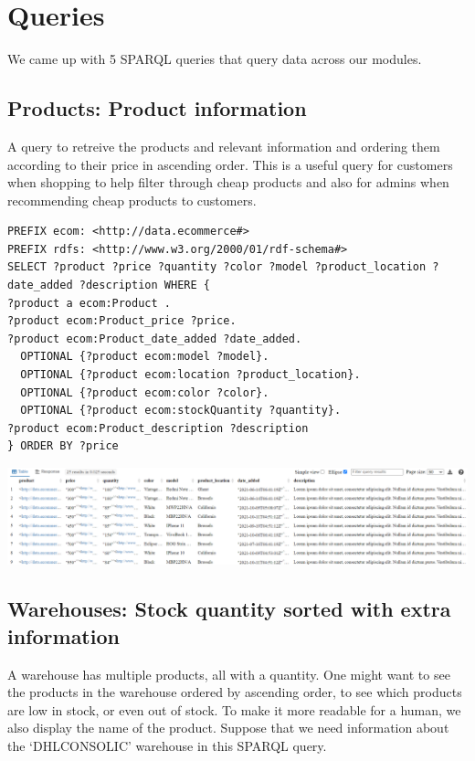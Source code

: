 \documentclass{article}
\begin{document}
\newpage


\section{Queries}
We came up with 5 SPARQL queries that query data across our modules.

\subsection{Products: Product information}
A query to retreive the products and relevant information and ordering them according to their price in ascending order. This is a useful query for customers when shopping to help filter through cheap products and also for admins when recommending cheap products to customers.

\begin{lstlisting}[breaklines, frame=single]
PREFIX ecom: <http://data.ecommerce#>
PREFIX rdfs: <http://www.w3.org/2000/01/rdf-schema#>
SELECT ?product ?price ?quantity ?color ?model ?product_location ?date_added ?description WHERE {
?product a ecom:Product .
?product ecom:Product_price ?price.
?product ecom:Product_date_added ?date_added.
  OPTIONAL {?product ecom:model ?model}.
  OPTIONAL {?product ecom:location ?product_location}.
  OPTIONAL {?product ecom:color ?color}.
  OPTIONAL {?product ecom:stockQuantity ?quantity}.
?product ecom:Product_description ?description
} ORDER BY ?price
\end{lstlisting}

\begin{center}
   \includegraphics[scale=1.05]{OISreport-product-query.png}
\end{center}

\newpage

\subsection{Warehouses: Stock quantity sorted with extra information}
A warehouse has multiple products, all with a quantity. One might want to see the products in the warehouse ordered by ascending order, to see which products are low in stock, or even out of stock. To make it more readable for a human, we also display the name of the product. Suppose that we need information about the `DHLCONSOLIC' warehouse in this SPARQL query.
\end{document}
